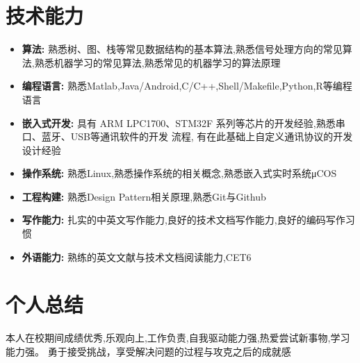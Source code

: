 \documentclass{resume}
\begin{document}
\section{技术能力}
\begin{itemize}[parsep=0.2ex]
  \item \textbf{算法:} 熟悉树、图、栈等常见数据结构的基本算法,熟悉信号处理方向的常见算法,熟悉机器学习的常见算法,熟悉常见的机器学习的算法原理
  \item \textbf{编程语言:} 熟悉Matlab,Java/Android,C/C++,Shell/Makefile,Python,R等编程语言
  \item \textbf{嵌入式开发:} 具有 ARM LPC1700、STM32F 系列等芯片的开发经验,熟悉串口、蓝牙、USB等通讯软件的开发
流程, 有在此基础上自定义通讯协议的开发设计经验
  \item \textbf{操作系统:} 熟悉Linux,熟悉操作系统的相关概念,熟悉嵌入式实时系统μCOS
  \item \textbf{工程构建:} 熟悉Design Pattern相关原理,熟悉Git与Github
  \item \textbf{写作能力:} 扎实的中英文写作能力,良好的技术文档写作能力,良好的编码写作习惯
  \item \textbf{外语能力:} 熟练的英文文献与技术文档阅读能力,CET6
\end{itemize}

\section{个人总结}
本人在校期间成绩优秀,乐观向上,工作负责,自我驱动能力强,热爱尝试新事物,学习能力强。
勇于接受挑战，享受解决问题的过程与攻克之后的成就感
%
%
\end{document}
